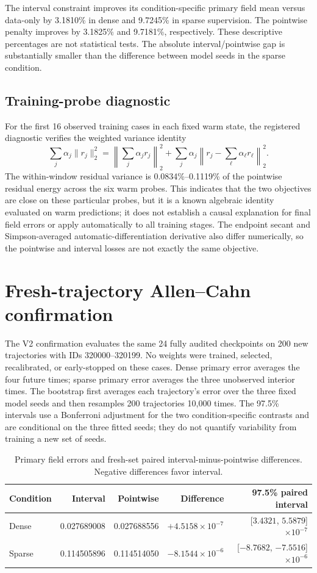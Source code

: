 \documentclass[10pt,a4paper]{article}
\begin{document}
The interval constraint improves its condition-specific primary field mean versus data-only by 3.1810\% in dense and 9.7245\% in sparse supervision. The pointwise penalty improves by 3.1825\% and 9.7181\%, respectively. These descriptive percentages are not statistical tests. The absolute interval/pointwise gap is substantially smaller than the difference between model seeds in the sparse condition.

\subsection{Training-probe diagnostic}
For the first 16 observed training cases in each fixed warm state, the registered diagnostic verifies the weighted variance identity
\[
  \sum_j \alpha_j\|r_j\|_2^2 = \left\|\sum_j\alpha_jr_j\right\|_2^2 + \sum_j\alpha_j\left\|r_j-\sum_\ell\alpha_\ell r_\ell\right\|_2^2.
\]
The within-window residual variance is 0.0834\%--0.1119\% of the pointwise residual energy across the six warm probes. This indicates that the two objectives are close on these particular probes, but it is a known algebraic identity evaluated on warm predictions; it does not establish a causal explanation for final field errors or apply automatically to all training stages. The endpoint secant and Simpson-averaged automatic-differentiation derivative also differ numerically, so the pointwise and interval losses are not exactly the same objective.

\section{Fresh-trajectory Allen--Cahn confirmation}
The V2 confirmation evaluates the same 24 fully audited checkpoints on 200 new trajectories with IDs 320000--320199. No weights were trained, selected, recalibrated, or early-stopped on these cases. Dense primary error averages the four future times; sparse primary error averages the three unobserved interior times. The bootstrap first averages each trajectory's error over the three fixed model seeds and then resamples 200 trajectories 10,000 times. The 97.5\% intervals use a Bonferroni adjustment for the two condition-specific contrasts and are conditional on the three fitted seeds; they do not quantify variability from training a new set of seeds.

\begin{table}[H]
\centering\scriptsize
\caption{Primary field errors and fresh-set paired interval-minus-pointwise differences. Negative differences favor interval.}
\label{tab:allen-fresh-primary}
\begin{tabular}{lrrrr}
\toprule
Condition & Interval & Pointwise & Difference & 97.5\% paired interval \\
\midrule
Dense & 0.027689008 & 0.027688556 & $+4.5158\times10^{-7}$ & [$3.4321$, $5.5879$]$\times10^{-7}$ \\
Sparse & 0.114505896 & 0.114514050 & $-8.1544\times10^{-6}$ & [$-8.7682$, $-7.5516$]$\times10^{-6}$ \\
\bottomrule
\end{tabular}
\end{table}
\end{document}
